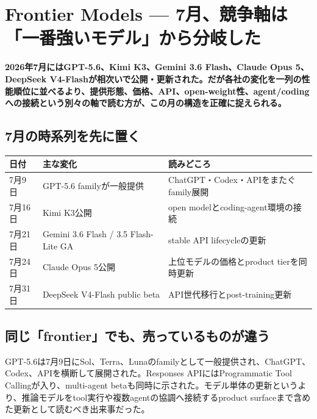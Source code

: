 \section{Frontier Models — 7月、競争軸は「一番強いモデル」から分岐した}
\noindent\textbf{2026年7月にはGPT-5.6、Kimi K3、Gemini 3.6 Flash、Claude Opus 5、DeepSeek V4-Flashが相次いで公開・更新された。だが各社の変化を一列の性能順位に並べるより、提供形態、価格、API、open-weight性、agent/codingへの接続という別々の軸で読む方が、この月の構造を正確に捉えられる。}\autocite{src-9191d43918fc,src-a24fd97eb3d0,src-e19fbb75eb44,src-e547d0d8cbe3,src-f6aa679babd7}

\subsection{7月の時系列を先に置く}

\begin{center}
\small
\begin{tabularx}{\columnwidth}{>{\raggedright\arraybackslash}X|>{\raggedright\arraybackslash}X|>{\raggedright\arraybackslash}X}
\toprule
\textbf{日付} & \textbf{主な変化} & \textbf{読みどころ} \\
\midrule
7月9日 & GPT-5.6 familyが一般提供 & ChatGPT・Codex・APIをまたぐfamily展開 \\
7月16日 & Kimi K3公開 & open modelとcoding-agent環境の接続 \\
7月21日 & Gemini 3.6 Flash / 3.5 Flash-Lite GA & stable API lifecycleの更新 \\
7月24日 & Claude Opus 5公開 & 上位モデルの価格とproduct tierを同時更新 \\
7月31日 & DeepSeek V4-Flash public beta & API世代移行とpost-training更新 \\
\bottomrule
\end{tabularx}
\autocite{src-9191d43918fc,src-a24fd97eb3d0,src-e19fbb75eb44,src-e547d0d8cbe3,src-f6aa679babd7}
\end{center}

\subsection{同じ「frontier」でも、売っているものが違う}

GPT-5.6は7月9日にSol、Terra、Lunaのfamilyとして一般提供され、ChatGPT、Codex、APIを横断して展開された。Responses APIにはProgrammatic Tool Callingが入り、multi-agent betaも同時に示された。モデル単体の更新というより、推論モデルをtool実行や複数agentの協調へ接続するproduct surfaceまで含めた更新として読むべき出来事だった。\autocite{src-e19fbb75eb44}


